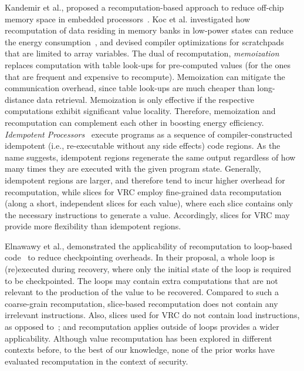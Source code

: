 Kandemir et al., proposed a recomputation-based approach to reduce off-chip memory space in embedded processors~\cite{Kandemir:2005gw}.  
Koc et al. investigated how recomputation of data residing in memory banks in low-power states can reduce the energy consumption~\cite{Koc:2006ce}, and devised compiler optimizations for scratchpads~\cite{Koc:2007bl} that are limited to array variables.
The dual of recomputation, \emph{memoization}~\cite{Sodani:1997hn, resistiveComp} replaces computation with table look-ups for pre-computed values (for the ones that are frequent and expensive to recompute). Memoization can mitigate the communication overhead, since table
look-ups are much cheaper than long-distance data retrieval. 
Memoization is only effective if the respective computations exhibit significant value locality. 
Therefore, memoization and recomputation can complement each other in boosting energy efficiency.
\emph{Idempotent Processors}~\cite{idem} execute programs as a sequence of
compiler-constructed idempotent (i.e., re-executable without any side effects) code regions.  
As the name suggests, idempotent regions regenerate the same output regardless of how many times they are executed with the given program state.  
Generally, idempotent regions are larger, and therefore tend to incur higher overhead for recomputation, while slices for VRC employ fine-grained data recomputation (along a short, independent slices for each value), where each slice contains only the necessary instructions to generate a value. 
Accordingly, slices for VRC may provide more flexibility than idempotent regions.

Elnawawy et al., demonstrated the applicability of recomputation to loop-based
code~\cite{Elnawawy2017} to reduce checkpointing overheads. 
In their proposal, a whole
loop is (re)executed during recovery, where only the initial state of the loop is
required to be checkpointed. 
The loops may contain extra computations that
are not relevant to the production of the value to be recovered. 
Compared to such a coarse-grain recomputation,
slice-based recomputation does not contain any irrelevant instructions. Also, slices used for VRC do not contain load
instructions, as opposed to~\cite{Elnawawy2017}; and recomputation applies outside of loops provides a wider applicability.
Although value recomputation has been explored in different contexts before, to the best of our knowledge, none of the prior works have evaluated recomputation in the context of security.
